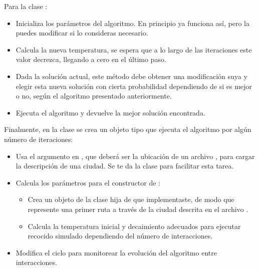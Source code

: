 Para la clase :
\begin{itemize}
 \item {}
 
 Inicializa los parámetros del algoritmo. En principio ya funciona así, pero la puedes modificar si lo consideras necesario.
 
 \item {}
 
 Calcula la nueva temperatura, se espera que a lo largo de las iteraciones este valor decrezca, llegando a cero en el último paso.
 
 \item {}
 
 Dada la solución actual, este método debe obtener una modificación suya y elegir esta nueva solución con cierta probabilidad dependiendo de si es mejor o no, según el algoritmo presentado anteriormente.
 
 \item {}
 
 Ejecuta el algoritmo y devuelve la mejor solución encontrada.
\end{itemize}

Finalmente, en la clase  se crea un objeto tipo  que ejecuta el algoritmo por algún número de iteraciones:

\begin{itemize}
 \item Usa el argumento en , que deberá ser la ubicación de un archivo , para cargar la descripción de una ciudad.  Se te da la clase  para facilitar esta tarea.

 \item Calcula los parámetros para el constructor de :
 
 \begin{itemize}
  \item Crea un objeto de la clase hija de  que implementaste, de modo que represente una primer ruta a través de la ciudad descrita en el archivo .
  
  \item Calcula la temperatura inicial y decaimiento adecuados para ejecutar recocido simulado dependiendo del número de interacciones.
 \end{itemize}

 \item Modifica el ciclo para monitorear la evolución del algoritmo entre interacciones.
\end{itemize}


